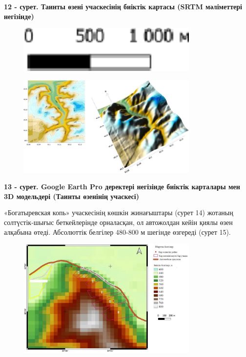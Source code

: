 {\bfseries 12 - сурет. Таинты өзені учаскесінің биіктік картасы (SRTM мәліметтері негізінде)}

\begin{figure}[H]
	\centering
	\includegraphics[width=0.8\textwidth]{media/ict2/image209}
	\caption*{}
\end{figure}

\begin{figure}[H]
	\centering
	\includegraphics[width=0.8\textwidth]{media/ict2/image216}
	\caption*{}
\end{figure}

{\bfseries 13 - сурет. Google Earth Pro деректері негізінде биіктік карталары мен 3D модельдері (Таинты өзенінің учаскесі)}

«Богатыревская копь» учаскесінің көшкін жинағыштары (сурет 14) жотаның
солтүстік-шығыс беткейлерінде орналасқан, ол автожолдан кейін қиялы өзен
алқабына өтеді. Абсолюттік белгілер 480-800 м шегінде өзгереді (сурет
15).

\begin{figure}[H]
	\centering
	\includegraphics[width=0.8\textwidth]{media/ict2/image217}
	\caption*{}
\end{figure}

